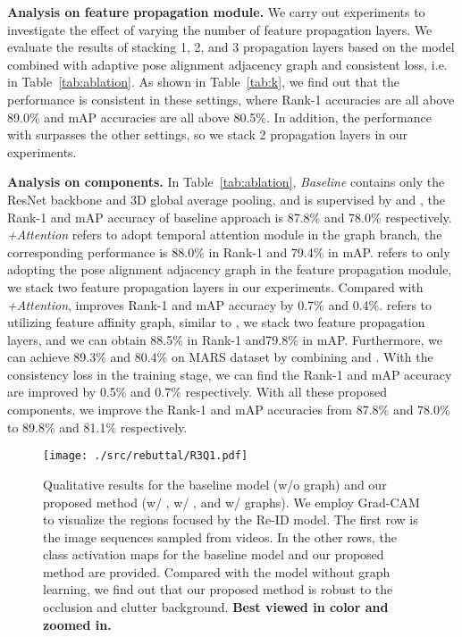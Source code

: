\documentclass[journal]{IEEEtran}
\let\MYoriglatexcaption\caption
\renewcommand{\caption}[2][\relax]{\MYoriglatexcaption[#2]{#2}}
\begin{document}
\textbf{Analysis on feature propagation module.}
We carry out experiments to investigate the effect of varying the number of feature propagation layers. We evaluate the results of stacking 1, 2, and 3 propagation layers based on the model combined with adaptive pose alignment adjacency graph and consistent loss, i.e.  in Table~\ref{tab:ablation}. As shown in Table~\ref{tab:k}, we find out that the performance is consistent in these settings, where Rank-1 accuracies are all above 89.0\% and mAP accuracies are all above 80.5\%. In addition, the performance with  surpasses the other settings, so we stack 2 propagation layers in our experiments.

\textbf{Analysis on components.} In Table~\ref{tab:ablation}, \textit{Baseline} contains only the ResNet backbone and 3D global average pooling, and is supervised by  and , the Rank-1 and mAP accuracy of baseline approach is 87.8\% and 78.0\% respectively. \textit{+Attention} refers to adopt temporal attention module in the graph branch, the corresponding performance is 88.0\% in Rank-1 and 79.4\% in mAP.  refers to only adopting the pose alignment adjacency graph in the feature propagation module, we stack two feature propagation layers in our experiments. Compared with \textit{+Attention},  improves Rank-1 and mAP accuracy by 0.7\% and 0.4\%.  refers to utilizing feature affinity graph, similar to , we stack two feature propagation layers, and we can obtain 88.5\% in Rank-1 and79.8\% in mAP. Furthermore, we can achieve 89.3\% and 80.4\% on MARS dataset by combining  and . With the consistency loss in the training stage, we can find the Rank-1 and mAP accuracy are improved by 0.5\% and 0.7\% respectively. With all these proposed components, we improve the Rank-1 and mAP accuracies from 87.8\% and 78.0\% to 89.8\% and 81.1\% respectively.

\begin{figure}[ht]
    \begin{center}
        \texttt{[image: ./src/rebuttal/R3Q1.pdf]}
    \end{center}
   \caption{Qualitative results for the baseline model (w/o graph) and our proposed method (w/ , w/ , and w/ graphs). We employ Grad-CAM to visualize the regions focused by the Re-ID model. The first row is the image sequences sampled from videos. In the other rows, the class activation maps for the baseline model and our proposed method are provided. Compared with the model without graph learning, we find out that our proposed method is robust to the occlusion and clutter background. \textbf{Best viewed in color and zoomed in.}}
\label{fig:visualization}
\end{figure}
\end{document}
